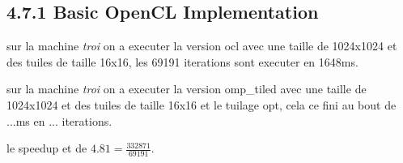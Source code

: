 \documentclass[10pt, a4paper]{article}
\begin{document}
\subsection{4.7.1 Basic OpenCL Implementation}


sur la machine \emph{troi} on a executer la version ocl avec une taille de 1024x1024 et des tuiles
de taille 16x16, les 69191 iterations sont executer en 1648ms.

sur la machine \emph{troi} on a executer la version omp\_tiled avec une taille de 1024x1024 et
des tuiles de taille 16x16 et le tuilage opt, cela ce fini au bout de ...ms en ... iterations.

le speedup et de $4.81=\frac{332871}{69191}$.
\end{document}
